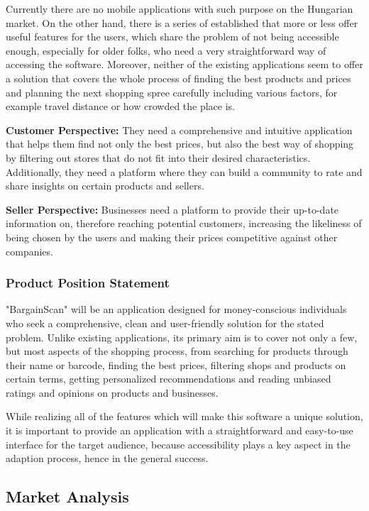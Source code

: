 Currently there are no mobile applications with such purpose on the Hungarian market. On the other hand, there is a series of established that more or less offer useful features for the users, which share the problem of not being accessible enough, especially for older folks, who need a very straightforward way of accessing the software. Moreover, neither of the existing applications seem to offer a solution that covers the whole process of finding the best products and prices and planning the next shopping spree carefully including various factors, for example travel distance or how crowded the place is.

\textbf{Customer Perspective:}
They need a comprehensive and intuitive application that helps them find not only the best prices, but also the best way of shopping by filtering out stores that do not fit into their desired characteristics. Additionally, they need a platform where they can build a community to rate and share insights on certain products and sellers.

\textbf{Seller Perspective:}
Businesses need a platform to provide their up-to-date information on, therefore reaching potential customers, increasing the likeliness of being chosen by the users and making their prices competitive against other companies.

\subsubsection{Product Position Statement}

"BargainScan" will be an application designed for money-conscious individuals who seek a comprehensive, clean and user-friendly solution for the stated problem. Unlike existing applications, its primary aim is to cover not only a few, but most aspects of the shopping process, from searching for products through their name or barcode, finding the best prices, filtering shops and products on certain terms, getting personalized recommendations and reading unbiased ratings and opinions on products and businesses. 

While realizing all of the features which will make this software a unique solution, it is important to provide an application with a straightforward and easy-to-use interface for the target audience, because accessibility plays a key aspect in the adaption process, hence in the general success.

\pagebreak

\subsection{Market Analysis}

